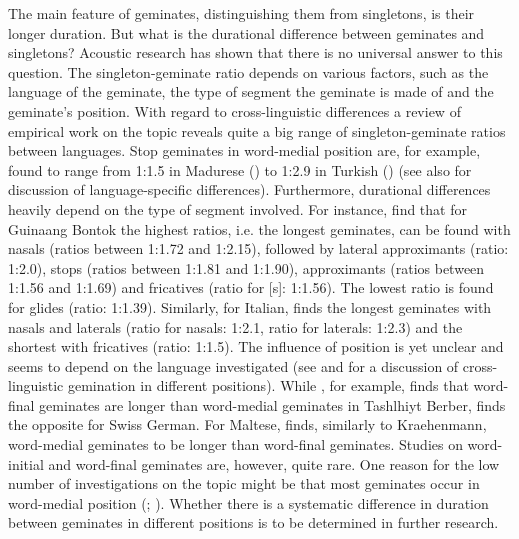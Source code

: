 The main feature of geminates, distinguishing them from singletons, is their longer duration. But what is the durational difference between geminates and singletons? Acoustic research has shown that there is no universal answer to this question. The singleton-geminate ratio depends on various factors, such as the language of the geminate, the type of segment the geminate is made of and the geminate's position. With regard to cross-linguistic differences a review of empirical work on the topic reveals quite a big range of singleton-geminate ratios between languages.  Stop geminates in word-medial position are, for example, found to range from 1:1.5 in Madurese (\citealt{Cohn.1999}) to 1:2.9 in Turkish (\citealt{Lahiri.1988}) (see also \citealt[38 f.]{Dmitrieva.2017} for discussion of language-specific differences). 
Furthermore, durational differences heavily depend on the type of segment involved. For instance, \cite{Aoyama.2006} find that for Guinaang Bontok the highest ratios, i.e. the longest geminates, can be found with nasals (ratios between 1:1.72 and 1:2.15), followed by lateral approximants (ratio: 1:2.0), stops (ratios between 1:1.81 and 1:1.90), approximants (ratios between 1:1.56 and 1:1.69) and fricatives (ratio for [s]: 1:1.56). The lowest ratio is found for glides (ratio: 1:1.39). Similarly, for Italian,  \cite{Payne.2005} finds the longest geminates with nasals and laterals (ratio for nasals: 1:2.1, ratio for laterals: 1:2.3) and the shortest with fricatives (ratio: 1:1.5). 
 The influence of position is yet unclear and seems to depend on the language investigated (see \citealt[chapter 3]{Galea.2016} and \citealt[36 f.]{Dmitrieva.2017} for a discussion of cross-linguistic gemination in different positions). While \cite{Ridouane.2010}, for example, finds that word-final geminates are longer than word-medial geminates in Tashlhiyt Berber, \cite{Kraehenmann.2001} finds the opposite for Swiss German. For Maltese, \cite{Galea.2016} finds, similarly to Kraehenmann, word-medial geminates to be longer than word-final geminates. Studies on word-initial and word-final geminates are, however, quite rare. One reason for the low number of investigations on the topic might be that most geminates occur in  word-medial position (\citealt[34]{Dmitrieva.2017}; \citealt[11]{Topintzi.2017}). Whether there is a systematic difference in duration between geminates in different positions is to be determined in further research.
 

